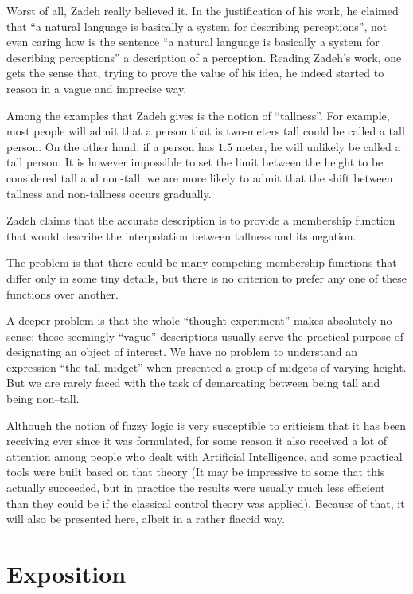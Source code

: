 Worst of all, Zadeh really believed it. In the justification
of his work, he claimed that ``a natural language is basically
a system for describing perceptions''\cite{Zadeh2008}, not
even caring how is the sentence ``a natural language is basically
a system for describing perceptions'' a description of
a perception. Reading Zadeh's work, one gets the sense that,
trying to prove the value of his idea, he indeed started to
reason in a vague and imprecise way.

Among the examples that Zadeh gives is the notion of ``tallness''.
For example, most people will admit that a person that is
two-meters tall could be called a tall person. On the other
hand, if a person has $1.5$ meter, he will unlikely be called
a tall person. It is however impossible to set the limit between
the height to be considered tall and non-tall: we are more
likely to admit that the shift between tallness and non-tallness
occurs gradually.

Zadeh claims that the accurate description is to provide
a membership function that would describe the interpolation
between tallness and its negation.

The problem is that there could be many competing
membership functions that differ only in some tiny details,
but there is no criterion to prefer any one of these functions
over another.

A deeper problem is that the whole ``thought experiment''
makes absolutely no sense: those seemingly ``vague''
descriptions usually serve the practical purpose
of designating an object of interest. We have no problem
to understand an expression ``the tall midget'' when
presented a group of midgets of varying height. But we
are rarely faced with the task of demarcating between
being tall and being non--tall.

Although the notion of fuzzy logic is very susceptible to
criticism that it has been receiving ever since it was
formulated, for some reason it also received a lot of attention
among people who dealt with Artificial Intelligence, and
some practical tools were built based on that theory
(It may be impressive to some that this actually succeeded,
but in practice the results were usually much less
efficient than they could be if the classical control
theory was applied).
Because of that, it will also be presented here, albeit
in a rather flaccid way.

\section{Exposition}

